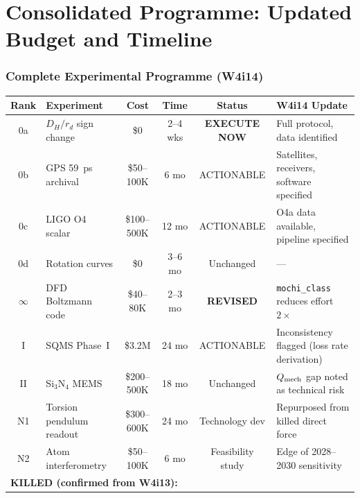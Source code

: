 \documentclass[11pt]{article}
\begin{document}
\part{Consolidated Programme: Updated Budget and Timeline}
\label{part:consolidated}

\section{Complete Experimental Programme (W4i14)}

\begin{center}
\renewcommand{\arraystretch}{1.3}
\begin{longtable}{@{}clcccl@{}}
\toprule
\textbf{Rank} & \textbf{Experiment} & \textbf{Cost} & \textbf{Time} &
  \textbf{Status} & \textbf{W4i14 Update} \\
\midrule
\endhead
0a & $D_H/r_d$ sign change & \$0 & 2--4 wks & \textbf{EXECUTE NOW} &
  Full protocol, data identified \\
0b & GPS 59~ps archival & \$50--100K & 6 mo & ACTIONABLE &
  Satellites, receivers, software specified \\
0c & LIGO O4 scalar & \$100--500K & 12 mo & ACTIONABLE &
  O4a data available, pipeline specified \\
0d & Rotation curves & \$0 & 3--6 mo & Unchanged & --- \\
\midrule
$\infty$ & DFD Boltzmann code & \$40--80K & 2--3 mo & \textbf{REVISED} &
  \texttt{mochi\_class} reduces effort $2\times$ \\
\midrule
I & SQMS Phase~I & \$3.2M & 24 mo & ACTIONABLE &
  Inconsistency flagged (loss rate derivation) \\
II & Si$_3$N$_4$ MEMS & \$200--500K & 18 mo & Unchanged &
  $Q_{\rm mech}$ gap noted as technical risk \\
\midrule
N1 & Torsion pendulum readout & \$300--600K & 24 mo & Technology dev &
  Repurposed from killed direct force \\
N2 & Atom interferometry & \$50--100K & 6 mo & Feasibility study &
  Edge of 2028--2030 sensitivity \\
\midrule
\multicolumn{6}{l}{\textbf{KILLED (confirmed from W4i13):}} \\

\end{longtable}
\end{center}
\end{document}
